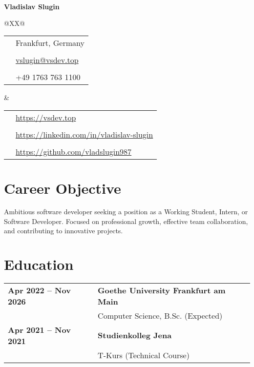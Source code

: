 \documentclass[11pt,a4paper]{article}
\newcommand{\contactItem}[2]{
    {\color{secondary}\small#1} & {\small\href{#2}{#2}} \\
}
\newcommand{\contactItemPlain}[2]{
    {\color{secondary}\small#1} & {\small#2} \\
}
\begin{document}
\sffamily

{\LARGE\bfseries\color{primary} Vladislav Slugin}
\vspace{1em}

\begin{tabularx}{\textwidth}{@{}XX@{}}
\begin{tabular}{@{}ll@{}}
    \contactItemPlain{\faMapMarker*}{Frankfurt, Germany}\\[0.3em]
    \contactItem{\faEnvelope}{vslugin@vsdev.top}\\[0.3em]
    \contactItemPlain{\faMobile*}{+49 1763 763 1100}
\end{tabular} &
\begin{tabular}{@{}ll@{}}
    \contactItem{\faGlobe}{https://vsdev.top}\\[0.3em]
    \contactItem{\faLinkedin}{https://linkedin.com/in/vladislav-slugin}\\[0.3em]
    \contactItem{\faGithub}{https://github.com/vladslugin987}
\end{tabular}
\end{tabularx}

\vspace{1em}

\section*{Career Objective}
{\justify
Ambitious software developer seeking a position as a Working Student, Intern, or Software Developer. Focused on professional growth, effective team collaboration, and contributing to innovative projects.
}

\section*{Education}
\begin{tabularx}{\textwidth}{@{}l X@{}}
\textbf{Apr 2022 -- Nov 2026} & \textbf{Goethe University Frankfurt am Main}\\
& Computer Science, B.Sc. (Expected)\\[0.8em]
\textbf{Apr 2021 -- Nov 2021} & \textbf{Studienkolleg Jena}\\
& T-Kurs (Technical Course)
\end{tabularx}
\end{document}
